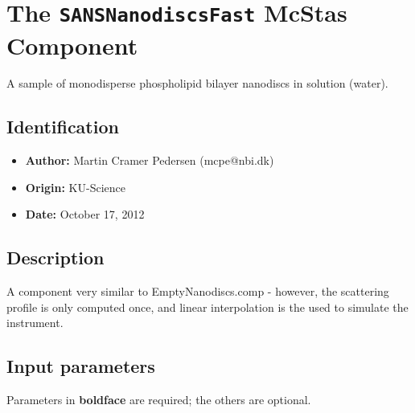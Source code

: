 \section{The \texttt{SANSNanodiscsFast} McStas Component}
A sample of monodisperse phospholipid bilayer nanodiscs in solution (water).

\subsection*{Identification}
\begin{itemize}
  \item \textbf{Author:} Martin Cramer Pedersen (mcpe@nbi.dk)
  \item \textbf{Origin:} KU-Science
  \item \textbf{Date:} October 17, 2012
\end{itemize}

\subsection*{Description}
A component very similar to EmptyNanodiscs.comp - however, the scattering profile is only computed once, and linear interpolation is the used to simulate the instrument.

\subsection*{Input parameters}
Parameters in \textbf{boldface} are required; the others are optional.

